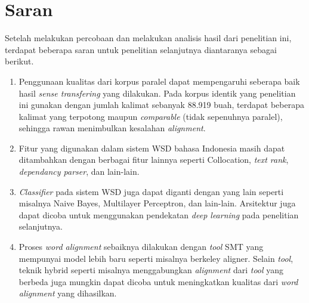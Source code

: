 \section{Saran}
Setelah melakukan percobaan dan melakukan analisis hasil dari penelitian ini, terdapat beberapa saran untuk penelitian selanjutnya diantaranya sebagai berikut.

\begin{enumerate}
	\item Penggunaan kualitas dari korpus paralel dapat mempengaruhi seberapa baik hasil \textit{sense transfering} yang dilakukan. Pada korpus identik yang penelitian ini gunakan dengan jumlah kalimat sebanyak 88.919 buah, terdapat beberapa kalimat yang terpotong maupun \textit{comparable} (tidak sepenuhnya paralel), sehingga rawan menimbulkan kesalahan \textit{alignment}.
	\item Fitur yang digunakan dalam sistem WSD bahasa Indonesia masih dapat ditambahkan dengan berbagai fitur lainnya seperti Collocation, \textit{text rank}, \textit{dependancy parser}, dan lain-lain.
	\item \textit{Classifier} pada sistem WSD juga dapat diganti dengan yang lain seperti misalnya Naive Bayes, Multilayer Perceptron, dan lain-lain. Arsitektur juga dapat dicoba untuk menggunakan pendekatan \textit{deep learning} pada penelitian selanjutnya.
	\item Proses \textit{word alignment} sebaiknya dilakukan dengan \textit{tool} SMT yang mempunyai model lebih baru seperti misalnya berkeley aligner. Selain \textit{tool}, teknik hybrid seperti misalnya menggabungkan \textit{alignment} dari \textit{tool} yang berbeda juga mungkin dapat dicoba untuk meningkatkan kualitas dari \textit{word alignment} yang dihasilkan.
\end{enumerate}